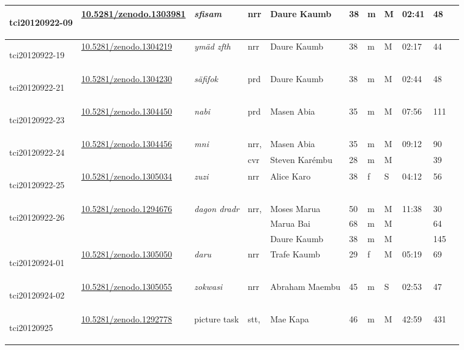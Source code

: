 \begin{landscape}
{\begin{longtable}{p{}llllllllll}
	\hypertarget{tci20120922-09}{tci20120922-09} &\href{https://zenodo.org/record/1303981}{10.5281/zenodo.1303981}& \emph{sfisam} & nrr & Daure Kaumb & 38 & m & M & 02:41 & 48\\\hline
	\hypertarget{tci20120922-19}{tci20120922-19} &\href{https://zenodo.org/record/1304219}{10.5281/zenodo.1304219}& \emph{ymäd zfth} & nrr & Daure Kaumb & 38 & m & M & 02:17 & 44\\\hline
	\hypertarget{tci20120922-21}{tci20120922-21} &\href{https://zenodo.org/record/1304230}{10.5281/zenodo.1304230}& \emph{säfifok} & prd & Daure Kaumb & 38 & m & M & 02:44 & 48\\\hline
	\hypertarget{tci20120922-23}{tci20120922-23} &\href{https://zenodo.org/record/1304450}{10.5281/zenodo.1304450}& \emph{nabi} & prd & Masen Abia & 35 & m & M & 07:56 &111\\\hline
	\multirow{2}{*}{\hypertarget{tci20120922-24}{tci20120922-24}} &\multirow{2}{*}{\href{https://zenodo.org/record/1304456}{10.5281/zenodo.1304456}}& \multirow{2}{*}{\emph{mni}} &nrr,& Masen Abia & 35 & m & M & \multirow{2}{*}{09:12} & 90\\
	&&&cvr&Steven Karémbu & 28 & m & M & &39\\\hline
	\hypertarget{tci20120922-25}{tci20120922-25} &\href{https://zenodo.org/record/1305034}{10.5281/zenodo.1305034}& \emph{zuzi} & nrr & Alice Karo & 38 & f & S & 04:12 & 56\\\hline
	\multirow{3}{*}{\hypertarget{tci20120922-26}{tci20120922-26}} &\multirow{3}{*}{\href{https://zenodo.org/record/1294676}{10.5281/zenodo.1294676}}& \multirow{3}{*}{\emph{dagon dradr}} & \multirow{2}{*}{nrr,} & Moses Marua & 50 & m & M & \multirow{3}{*}{11:38} & 30\\
	&&&\multirow{2}{*}{cvr}&Marua Bai & 68 & m &M &  & 64\\
	&&&&Daure Kaumb & 38 & m & M & & 145\\\hline
	\hypertarget{tci20120924-01}{tci20120924-01} &\href{https://zenodo.org/record/1305050}{10.5281/zenodo.1305050}& \emph{daru} & nrr & Trafe Kaumb & 29 & f & M & 05:19 & 69\\\hline
	\hypertarget{tci20120924-02}{tci20120924-02} &\href{https://zenodo.org/record/1305055}{10.5281/zenodo.1305055}& \emph{zokwasi} & nrr & Abraham Maembu & 45 & m & S & 02:53 & 47\\\hline
	\multirow{3}{*}{\hypertarget{tci20120925}{tci20120925}}&\multirow{3}{*}{\href{https://zenodo.org/record/1292778}{10.5281/zenodo.1292778}}& \multirow{3}{*}{picture task} & \multirow{2}{*}{stt,} & Mae Kapa & 46 & m & M & \multirow{3}{*}{42:59} & 431\\

\end{longtable}}
\end{landscape}

